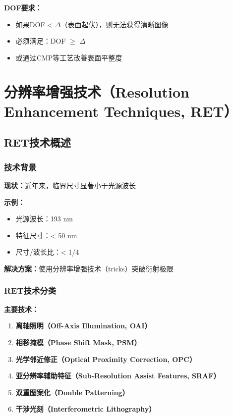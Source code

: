 \documentclass[UTF8,12pt,a4paper]{ctexart}
\begin{document}
\textbf{DOF要求：}
\begin{itemize}
    \item 如果DOF < $\Delta$（表面起伏），则无法获得清晰图像
    \item 必须满足：DOF $\geq$ $\Delta$
    \item 或通过CMP等工艺改善表面平整度
\end{itemize}

\section{分辨率增强技术（Resolution Enhancement Techniques, RET）}

\subsection{RET技术概述}

\subsubsection{技术背景}

\textbf{现状：}近年来，临界尺寸显著小于光源波长

\textbf{示例：}
\begin{itemize}
    \item 光源波长：193 nm
    \item 特征尺寸：< 50 nm
    \item 尺寸/波长比：< 1/4
\end{itemize}

\textbf{解决方案：}使用分辨率增强技术（tricks）突破衍射极限

\subsubsection{RET技术分类}

\textbf{主要技术：}
\begin{enumerate}
    \item \textbf{离轴照明（Off-Axis Illumination, OAI）}
    \item \textbf{相移掩模（Phase Shift Mask, PSM）}
    \item \textbf{光学邻近修正（Optical Proximity Correction, OPC）}
    \item \textbf{亚分辨率辅助特征（Sub-Resolution Assist Features, SRAF）}
    \item \textbf{双重图案化（Double Patterning）}
    \item \textbf{干涉光刻（Interferometric Lithography）}
\end{enumerate}
\end{document}

